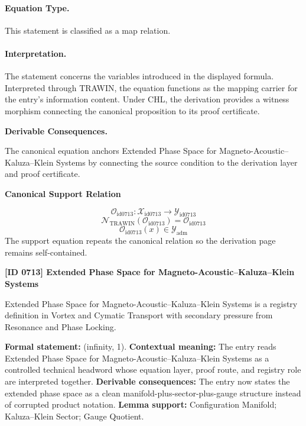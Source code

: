 \paragraph{Equation Type.}
This statement is classified as a map relation.

\paragraph{Interpretation.}
The statement concerns the variables introduced in the displayed formula. Interpreted through TRAWIN, the equation functions as the mapping carrier for the entry’s information content. Under CHL, the derivation provides a witness morphism connecting the canonical proposition to its proof certificate.

\par\vspace{0.35em}
\noindent\textbf{Derivable Consequences.}\quad
\begingroup
\footnotesize
\raggedright
The canonical equation anchors Extended Phase Space for Magneto-Acoustic--Kaluza--Klein Systems by connecting the source condition to the derivation layer and proof certificate.
\par\endgroup

\noindent\textbf{Canonical Support Relation}\par
\[
\mathcal{O}_{\mathrm{id0713}}:\mathcal{X}_{\mathrm{id0713}}\longrightarrow\mathcal{Y}_{\mathrm{id0713}}
\]
\[
\mathcal{N}_{\mathrm{TRAWIN}}(\mathcal{O}_{\mathrm{id0713}})=\mathcal{O}_{\mathrm{id0713}}
\]
\[
\mathcal{O}_{\mathrm{id0713}}(x)\in\mathcal{Y}_{\mathrm{adm}}
\]
\noindent The support equation repeats the canonical relation so the derivation page remains self-contained.\par

\clearpage
\noindent\textbf{[ID 0713] Extended Phase Space for Magneto-Acoustic--Kaluza--Klein Systems}\par
\vspace{0.35em}
\begingroup\small
{}
Extended Phase Space for Magneto-Acoustic--Kaluza--Klein Systems is a registry definition in Vortex and Cymatic Transport with secondary pressure from Resonance and Phase Locking.

\begingroup\footnotesize\setlength{\emergencystretch}{3em}\sloppy
\textbf{Formal statement:} (infinity, 1). \textbf{Contextual meaning:} The entry reads Extended Phase Space for Magneto-Acoustic--Kaluza--Klein Systems as a controlled technical headword whose equation layer, proof route, and registry role are interpreted together. \textbf{Derivable consequences:} The entry now states the extended phase space as a clean manifold-plus-sector-plus-gauge structure instead of corrupted product notation. \textbf{Lemma support:} Configuration Manifold; Kaluza--Klein Sector; Gauge Quotient.\par
\endgroup

